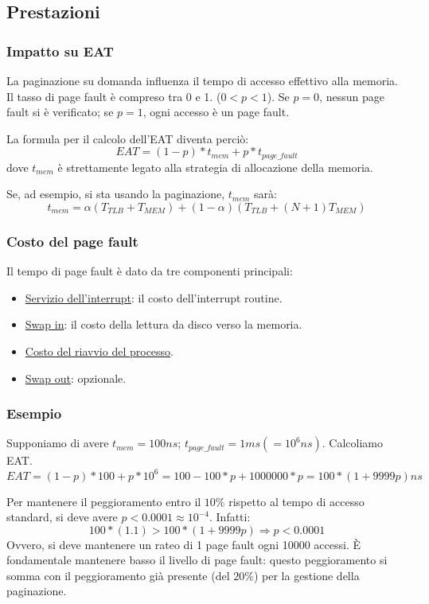 \documentclass[a4paper,12pt, twoside]{report}
\newcommand{\defbox}[1]{\noindent\colorbox{shadecolor}
{\parbox{\dimexpr\textwidth-2\fboxsep\relax}{#1}}}
\begin{document}
\subsection{Prestazioni}

\subsubsection{Impatto su EAT}
La paginazione su domanda influenza il tempo di accesso effettivo alla memoria. Il tasso di page fault 
\`e compreso tra 0 e 1. ($0 < p < 1$). Se $p = 0$, nessun page fault si \`e verificato; se $p = 1$, ogni 
accesso \`e un page fault.

\defbox{La formula per il calcolo dell'EAT diventa perci\`o: 
\[ EAT = (1 - p) * t_{mem} + p * t_{page\_fault} \]
dove $t_{mem}$ \`e strettamente legato alla strategia di allocazione della memoria.}

Se, ad esempio, si sta usando la paginazione, $t_{mem}$ sar\`a:
\[ t_{mem} = \alpha (T_{TLB} + T_{MEM}) + (1 - \alpha)(T_{TLB} + (N+1)T_{MEM}) \]

\subsubsection{Costo del page fault} 
Il tempo di page fault \`e dato da tre componenti principali:
\begin{itemize}
    \item \underline{Servizio dell'interrupt}: il costo dell'interrupt routine. 
    \item \underline{Swap in}: il costo della lettura da disco verso la memoria.
    \item \underline{Costo del riavvio del processo}.
    \item \underline{Swap out}: opzionale.
\end{itemize}

\subsubsection{Esempio}
Supponiamo di avere $t_{mem} = 100ns$; $t_{page\_fault} = 1ms (= 10^6ns)$. Calcoliamo EAT. 
\[ EAT = (1 - p) * 100 + p * 10^6 = 100 - 100*p + 1000000*p = 100*(1 + 9999 p)ns \]

Per mantenere il peggioramento entro il $10\%$ rispetto al tempo di accesso standard, si deve avere 
$p < 0.0001 \approx 10^{-4}$. Infatti:
\[ 100 * (1.1) > 100 * (1 + 9999p) \Rightarrow p < 0.0001\]
Ovvero, si deve mantenere un rateo di 1 page fault ogni 10000 accessi. \`E fondamentale mantenere basso 
il livello di page fault: questo peggioramento si somma con il peggioramento gi\`a presente (del $20\%$) 
per la gestione della paginazione. 
\end{document}
